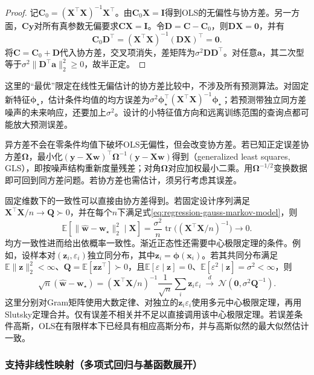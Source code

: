 \begin{proof}
记$\bm{C}_0=(\bm{X}^{\top}\bm{X})^{-1}\bm{X}^{\top}$。由$\bm{C}_0\bm{X}=\bm{I}$得到OLS的无偏性与协方差。另一方面，$\bm{C}\bm{y}$对所有真参数无偏要求$\bm{C}\bm{X}=\bm{I}$。令$\bm{D}=\bm{C}-\bm{C}_0$，则$\bm{D}\bm{X}=\bm{0}$，并有
\[
  \bm{C}_0\bm{D}^{\top}
  =(\bm{X}^{\top}\bm{X})^{-1}(\bm{D}\bm{X})^{\top}=\bm{0}.
\]
将$\bm{C}=\bm{C}_0+\bm{D}$代入协方差，交叉项消失，差矩阵为$\sigma^2\bm{D}\bm{D}^{\top}$。对任意$\bm{a}$，其二次型等于$\sigma^2\lVert\bm{D}^{\top}\bm{a}\rVert_2^2\geq0$，故半正定。
\end{proof}

这里的“最优”限定在线性无偏估计的协方差比较中，不涉及所有预测算法。对固定新特征$\bm{\phi}_{\star}$，估计条件均值的均方误差为$\sigma^2\bm{\phi}_{\star}^{\top}(\bm{X}^{\top}\bm{X})^{-1}\bm{\phi}_{\star}$；若预测带独立同方差噪声的未来响应，还要加上$\sigma^2$。设计的小特征值方向和远离训练范围的查询点都可能放大预测误差。

异方差不会在零条件均值下破坏OLS无偏性，但会改变协方差。若已知正定误差协方差$\bm{\Omega}$，最小化$(\bm{y}-\bm{X}\bm{w})^{\top}\bm{\Omega}^{-1}(\bm{y}-\bm{X}\bm{w})$得到（generalized least squares, GLS），即按噪声结构重新度量残差；对角$\bm{\Omega}$对应加权最小二乘。用$\bm{\Omega}^{-1/2}$变换数据即可回到同方差问题。若协方差也需估计，须另行考虑其误差。

固定维数下的一致性可以直接由协方差得到。若固定设计序列满足$\bm{X}^{\top}\bm{X}/n\to\bm{Q}\succ0$，并在每个$n$下满足式\eqref{eq:regression-gauss-markov-model}，则
\[
  \mathbb{E}[\lVert\widehat{\bm{w}}-\bm{w}_{\star}\rVert_2^2\mid\bm{X}]
  =\frac{\sigma^2}{n}\operatorname{tr}
       \bigl((\bm{X}^{\top}\bm{X}/n)^{-1}\bigr)\longrightarrow0.
\]
均方一致性进而给出依概率一致性。渐近正态性还需要中心极限定理的条件。例如，设样本对$(\bm{z}_i,\varepsilon_i)$独立同分布，其中$\bm{z}_i=\bm{\phi}(\bm{x}_i)$。若其共同分布满足$\mathbb{E}\lVert\bm{z}\rVert_2^2<\infty$、$\bm{Q}=\mathbb{E}[\bm{z}\bm{z}^{\top}]\succ0$，且$\mathbb{E}[\varepsilon\mid\bm{z}]=0$、$\mathbb{E}[\varepsilon^2\mid\bm{z}]=\sigma^2<\infty$，则
\[
  \sqrt n(\widehat{\bm{w}}-\bm{w}_{\star})
  =
  (\bm{X}^{\top}\bm{X}/n)^{-1}
  \frac{1}{\sqrt n}\sum_i\bm{z}_i\varepsilon_i
  \ \xrightarrow{d}\ \mathcal{N}(\bm{0},\sigma^2\bm{Q}^{-1}).
\]
这里分别对Gram矩阵使用大数定律、对独立的$\bm{z}_i\varepsilon_i$使用多元中心极限定理，再用Slutsky定理合并。仅有误差不相关并不足以直接调用该中心极限定理。若误差条件高斯，OLS在有限样本下已经具有相应高斯分布，并与高斯似然的最大似然估计一致。

\subsubsection{支持非线性映射（多项式回归与基函数展开）}
\label{sec:regression-basis}


